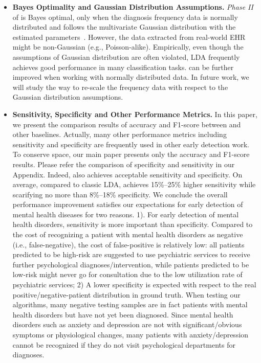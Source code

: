 \begin{itemize}

\item \textbf{Bayes Optimality and Gaussian Distribution Assumptions. } \emph{Phase II} of \TheName{} is Bayes optimal, only when the diagnosis frequency data is normally distributed and follows the multivariate Gaussian distribution with the estimated parameters~\cite{hamsici2008bayes}. 
However, the data extracted from real-world EHR might be non-Gaussian (e.g., Poisson-alike). Empirically, even though the assumptions of Gaussian distribution are often violated, LDA frequently achieves good performance in many classification tasks. 
\TheName{} can be further improved when working with normally distributed data. 
In future work, we will study the way to re-scale the frequency data with respect to the Gaussian distribution assumptions.

\item \textbf{Sensitivity, Specificity and Other Performance Metrics. } In this paper, we present the comparison results of accuracy and F1-score between \TheName{} and other baselines. 
Actually, many other performance metrics including sensitivity and specificity are frequently used in other early detection work. 
To conserve space, our main paper presents only the accuracy and F1-score results. 
Please refer the comparison of specificity and sensitivity in our Appendix. 
Indeed, \TheName{} also achieves acceptable sensitivity and specificity. 
On average, compared to classic LDA, \TheName{} achieves 15\%--25\% higher sensitivity while scarifying no more than 8\%--18\% specificity. 
We conclude the overall performance improvement satisfies our expectations for early detection of mental health diseases for two reasons.  1). For early detection of mental health disorders, sensitivity is more important than specificity.  
Compared to the cost of recognizing a patient with mental health disorders as negative (i.e., false-negative), the cost of false-positive is relatively low: 
all patients predicted to be high-risk are suggested to use psychiatric services to receive further psychological diagnoses/intervention, while patients predicted to be low-risk might never go for consultation due to the low utilization rate of psychiatric services; 
2) A lower specificity is expected with respect to the real positive/negative-patient distribution in ground truth. 
When testing our algorithms, many negative testing samples are in fact patients with mental health disorders but have not yet been diagnosed. 
Since mental health disorders such as anxiety and depression are not with significant/obvious symptoms or physiological changes, many patients with anxiety/depression cannot be recognized if they do not visit psychological departments for diagnoses.


\end{itemize}
